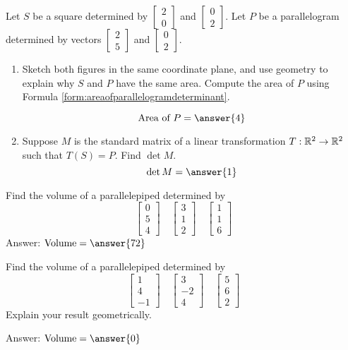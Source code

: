\documentclass{ximera}
\author{Zack Reed}
\begin{document}
\begin{problem}\label{prob:areasquareandparal} Let $S$ be a square determined by $\begin{bmatrix}2\\0\end{bmatrix}$ and $\begin{bmatrix}0\\2\end{bmatrix}$.  Let $P$ be a parallelogram determined by vectors $\begin{bmatrix}2\\5\end{bmatrix}$ and $\begin{bmatrix}0\\2\end{bmatrix}$. 
  \begin{enumerate}
  \item Sketch both figures in the same coordinate plane, and use geometry to explain why $S$ and $P$ have the same area.  Compute the area of $P$ using Formula \ref{form:areaofparallelogramdeterminant}.
   
  $$\text{Area of }P=\answer{4}$$
  \item Suppose $M$ is the standard matrix of a linear transformation $T:\mathbb{R}^2\rightarrow\mathbb{R}^2$ such that $T(S)=P$.  Find $\det M$.
  $$\det M=\answer{1}$$
  \end{enumerate}
\end{problem}

   
\begin{problem}\label{prob:volparallelepiped}
  Find the volume of a parallelepiped determined by
  $$\begin{bmatrix}0\\5\\4\end{bmatrix}\quad\begin{bmatrix}3\\1\\2\end{bmatrix}\quad\begin{bmatrix}1\\1\\6\end{bmatrix}$$
  Answer: $\mbox{Volume}=\answer{72}$
  \end{problem}
   
  \begin{problem}\label{prob:volparallelepiped0}
  Find the volume of a parallelepiped determined by
  $$\begin{bmatrix}1\\4\\-1\end{bmatrix}\quad\begin{bmatrix}3\\-2\\4\end{bmatrix}\quad\begin{bmatrix}5\\6\\2\end{bmatrix}$$
  Explain your result geometrically.
   
  Answer: $\mbox{Volume}=\answer{0}$
  \end{problem}
\end{document}
